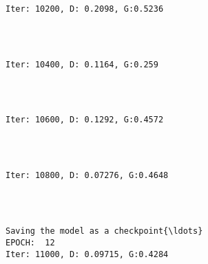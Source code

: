 \documentclass[11pt]{article}
\begin{document}
    \begin{Verbatim}[commandchars=\\\{\}]

Iter: 10200, D: 0.2098, G:0.5236
    \end{Verbatim}

    \begin{center}
    \end{center}
    { \hspace*{\fill} \\}
    
    \begin{Verbatim}[commandchars=\\\{\}]

Iter: 10400, D: 0.1164, G:0.259
    \end{Verbatim}

    \begin{center}
    \end{center}
    { \hspace*{\fill} \\}
    
    \begin{Verbatim}[commandchars=\\\{\}]

Iter: 10600, D: 0.1292, G:0.4572
    \end{Verbatim}

    \begin{center}
    \end{center}
    { \hspace*{\fill} \\}
    
    \begin{Verbatim}[commandchars=\\\{\}]

Iter: 10800, D: 0.07276, G:0.4648
    \end{Verbatim}

    \begin{center}
    \end{center}
    { \hspace*{\fill} \\}
    
    \begin{Verbatim}[commandchars=\\\{\}]

Saving the model as a checkpoint{\ldots}
EPOCH:  12
Iter: 11000, D: 0.09715, G:0.4284
    \end{Verbatim}
\end{document}
